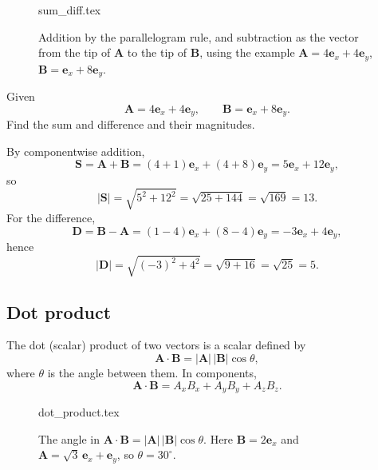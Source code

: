 \begin{figure}[htb]
    \centering
    {sum_diff.tex}
    \caption{Addition by the parallelogram rule, and subtraction as the vector from the tip of $\mathbf{A}$ to the tip of $\mathbf{B}$, using the example $\mathbf{A}=4\mathbf{e}_x+4\mathbf{e}_y$, $\mathbf{B}=\mathbf{e}_x+8\mathbf{e}_y$.}
    \label{fig:vec_sum_diff}
\end{figure}

\begin{example}
Given
\begin{equation}
\mathbf{A}=4\mathbf{e}_x+4\mathbf{e}_y,
\qquad
\mathbf{B}=\mathbf{e}_x+8\mathbf{e}_y.
\end{equation}
Find the sum and difference and their magnitudes.

By componentwise addition,
\begin{equation}
\mathbf{S}=\mathbf{A}+\mathbf{B}=(4+1)\mathbf{e}_x+(4+8)\mathbf{e}_y=5\mathbf{e}_x+12\mathbf{e}_y,
\end{equation}
so
\begin{equation}
|\mathbf{S}|=\sqrt{5^2+12^2}=\sqrt{25+144}=\sqrt{169}=13.
\end{equation}
For the difference,
\begin{equation}
\mathbf{D}=\mathbf{B}-\mathbf{A}=(1-4)\mathbf{e}_x+(8-4)\mathbf{e}_y=-3\mathbf{e}_x+4\mathbf{e}_y,
\end{equation}
hence
\begin{equation}
|\mathbf{D}|=\sqrt{(-3)^2+4^2}=\sqrt{9+16}=\sqrt{25}=5.
\end{equation}
\end{example}

\subsection{Dot product}
The dot (scalar) product of two vectors is a scalar defined by
\begin{equation}
    \mathbf{A}\cdot\mathbf{B}=|\mathbf{A}|\,|\mathbf{B}|\cos\theta,
\end{equation}
where $\theta$ is the angle between them. In components,
\begin{equation}
    \mathbf{A}\cdot\mathbf{B}=A_xB_x+A_yB_y+A_zB_z.
\end{equation}

\begin{figure}[htb]
    \centering
    {dot_product.tex}
    \caption{The angle in $\mathbf{A}\cdot\mathbf{B}=|\mathbf{A}|\,|\mathbf{B}|\cos\theta$. Here $\mathbf{B}=2\mathbf{e}_x$ and $\mathbf{A}=\sqrt{3}\,\mathbf{e}_x+\mathbf{e}_y$, so $\theta=30^\circ$.}
    \label{fig:vec_dot}
\end{figure}

